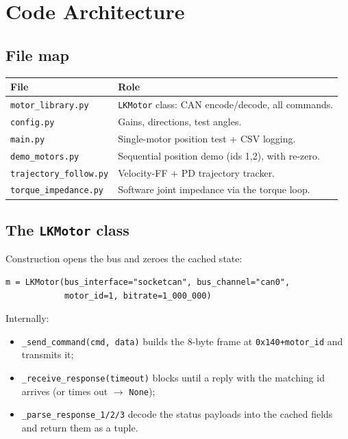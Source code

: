 \documentclass[11pt,a4paper]{article}
\newcommand{\code}[1]{\texttt{#1}}
\begin{document}
\section{Code Architecture}

\subsection{File map}
\begin{center}
\begin{tabular}{@{}ll@{}}
\toprule
\textbf{File} & \textbf{Role} \\
\midrule
\code{motor\_library.py}    & \code{LKMotor} class: CAN encode/decode, all commands. \\
\code{config.py}            & Gains, directions, test angles. \\
\code{main.py}              & Single-motor position test + CSV logging. \\
\code{demo\_motors.py}      & Sequential position demo (ids 1,2), with re-zero. \\
\code{trajectory\_follow.py}& Velocity-FF + PD trajectory tracker. \\
\code{torque\_impedance.py} & Software joint impedance via the torque loop. \\
\bottomrule
\end{tabular}
\end{center}

\subsection{The \texttt{LKMotor} class}
Construction opens the bus and zeroes the cached state:
\begin{lstlisting}
m = LKMotor(bus_interface="socketcan", bus_channel="can0",
            motor_id=1, bitrate=1_000_000)
\end{lstlisting}
Internally:
\begin{itemize}[nosep]
  \item \code{\_send\_command(cmd, data)} builds the 8-byte frame at
        \code{0x140+motor\_id} and transmits it;
  \item \code{\_receive\_response(timeout)} blocks until a reply with the
        matching id arrives (or times out $\to$ \code{None});
  \item \code{\_parse\_response\_1/2/3} decode the status payloads into the
        cached fields and return them as a tuple.
\end{itemize}
\end{document}
